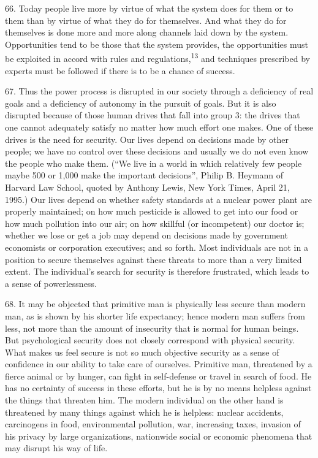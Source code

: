 \documentclass{article}
\begin{document}
66.  Today people live more by virtue of what the system does for them or to them than by virtue 
of what they do for themselves.  And what they do for themselves is done more and more along 
channels laid down by the system.   Opportunities tend to be those that the system provides, the 
opportunities must be exploited in accord with rules and regulations,\textsuperscript{13} and techniques prescribed 
by experts must be followed if there is to be a chance of success. \vspace{\baselineskip}

67.  Thus the power process is disrupted in our society through a deficiency  of real  goals and a 
deficiency of autonomy in the pursuit of goals.  But it is also disrupted because of those human 
drives  that  fall  into  group  3:  the  drives  that  one  cannot  adequately  satisfy  no  matter  how  much  
effort one makes.  One of these drives is the need for security.  Our lives depend on decisions made 
by other people; we have no control over these decisions and usually we  do not even know the 
people  who  make  them.   (“We  live  in  a  world  in  which  relatively  few  people maybe  500  or  
1,000 make  the  important  decisions”,  Philip  B.   Heymann  of  Harvard  Law  School,  quoted  by  
Anthony Lewis, New York Times, April 21, 1995.) Our lives depend on whether safety standards 
at a nuclear power plant are properly maintained; on how much pesticide is allowed to get into our 
food or how much pollution into our air; on how skillful (or incompetent) our doctor is; whether 
we  lose  or  get  a  job  may  depend  on  decisions  made  by  government  economists  or  corporation  
executives; and so forth.  Most individuals are not in a position to secure themselves against these 
threats  to  more  than  a  very  limited  extent.   The  individual’s  search  for  security  is  therefore  
frustrated, which leads to a sense of powerlessness. \vspace{\baselineskip}

68.  It may be objected that primitive man is physically less secure than modern man, as is shown 
by his shorter life expectancy; hence modern man suffers from less, not more than the amount of 
insecurity that is normal for human beings.  But psychological security does not closely correspond 
with physical security.  What makes us feel secure is not so much objective security as a sense of 
confidence in our ability to take care of ourselves.  Primitive man, threatened by a fierce animal 
or by hunger, can fight in self-defense or travel in search of food.  He has no certainty of success 
in these efforts, but he is by no means helpless against the things that threaten him.  The modern 
individual  on  the  other  hand  is  threatened  by  many  things  against  which  he  is  helpless:  nuclear  
accidents,  carcinogens  in  food,  environmental  pollution,  war,  increasing  taxes,  invasion  of  his  
privacy  by  large  organizations,  nationwide  social  or  economic  phenomena  that  may  disrupt  his  
way of life. \vspace{\baselineskip}
\end{document}
